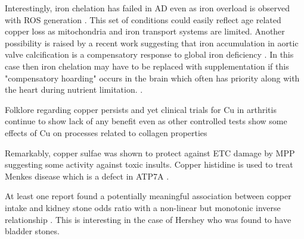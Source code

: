 {\begin{quote}
\end{quote}

Interestingly, iron chelation has failed in AD
even as iron overload is observed with ROS generation
\cite{PMID39031369}. This set of conditions could easily
reflect age related copper loss as mitochondria and iron 
transport systems are limited.
 Another possibility is raised by a  recent work suggesting
that iron accumulation in aortic valve calcification
is a compensatory response to global iron deficiency
\cite{PMID39728514}. In this case then iron chelation may
have to be replaced with supplementation if this "compensatory
hoarding" occurs in the brain which often has priority along
with the heart during nutrient limitation. .  

Folklore regarding copper persists and yet clinical trials
for Cu in arthritis continue to show lack of any benefit
\cite{10.1371/journal.pone.0071529}
even as other controlled tests show some effects of Cu on
processes related to collagen properties
\cite{PMID6110524}

Remarkably, copper sulfae was shown to protect against
ETC damage by MPP \cite{RUBIOOSORNIO20171} suggesting
some activity against toxic insults.
Copper histidine is used to treat Menkes disease
which is a defect in ATP7A
\cite{Munakata_Sakamoto_Kitamura_effects_copper_2005}.



At least one report found a potentially meaningful association
between copper intake and kidney stone odds ratio
with a non-linear but monotonic inverse relationship
\cite{PMC9469499}. This is interesting in the case of Hershey
who was found to have bladder stones.  





} %

